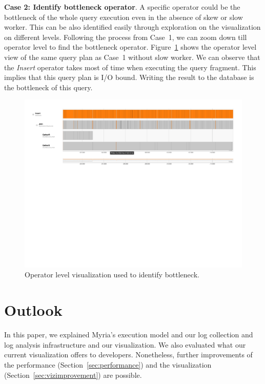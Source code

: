 \documentclass[11pt]{scrartcl}
\begin{document}
\noindent \textbf{Case 2: Identify bottleneck operator}.
A specific operator could be the bottleneck of the whole query execution even in the absence of skew or slow worker. This can be also identified easily through exploration on the visualization on different levels. Following the process from Case~1, we can zoom down till operator level to find the bottleneck operator. Figure~\ref{fig:bottleneck_operator} shows the operator level view of the same query plan as Case~1 without slow worker. We can observe that the \emph{Insert} operator takes most of time when executing the query fragment. This implies that this query plan is I/O bound. Writing the result to the database is the bottleneck of this query.

\begin{figure}[h]
  \begin{center}
	\includegraphics[width=\textwidth]{bottleneck_operator.pdf}
  \end{center}
 \caption{Operator level visualization used to identify bottleneck.}
  \label{fig:bottleneck_operator}
 \end{figure}


\section{Outlook}
\label{sec:outlook}

In this paper, we explained Myria's execution model and our log collection and log analysis infrastructure and our visualization. We also evaluated what our current visualization offers to developers. Nonetheless, further improvements of the performance (Section~\ref{sec:performance}) and the visualization (Section~\ref{sec:vizimprovement}) are possible.
\end{document}
